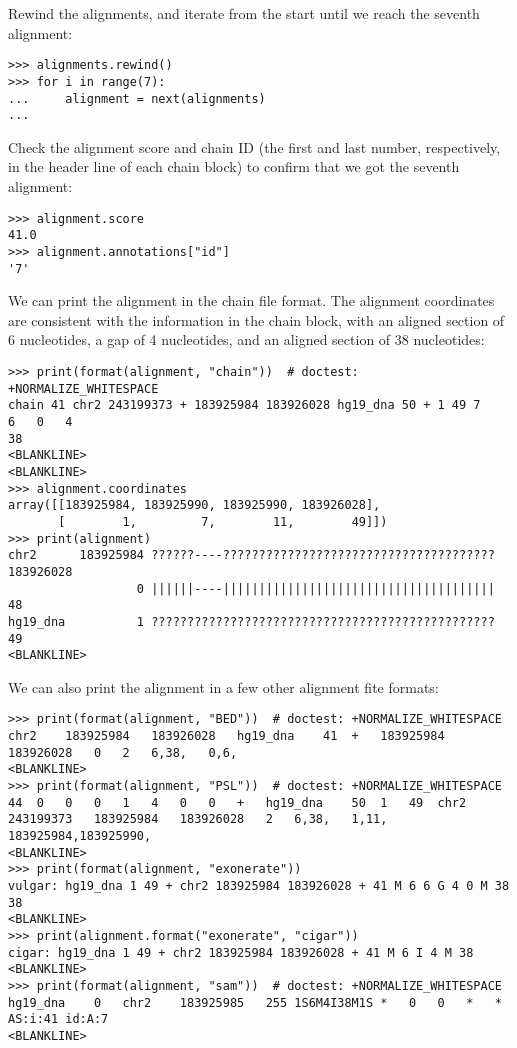 Rewind the alignments, and iterate from the start until we reach the seventh alignment:
\begin{verbatim}
>>> alignments.rewind()
>>> for i in range(7):
...     alignment = next(alignments)
...
\end{verbatim}
Check the alignment score and chain ID (the first and last number, respectively, in the header line of each chain block) to confirm that we got the seventh alignment:
\begin{verbatim}
>>> alignment.score
41.0
>>> alignment.annotations["id"]
'7'
\end{verbatim}
We can print the alignment in the chain file format. The alignment coordinates are consistent with the information in the chain block, with an aligned section of 6 nucleotides, a gap of 4 nucleotides, and an aligned section of 38 nucleotides:
\begin{verbatim}
>>> print(format(alignment, "chain"))  # doctest: +NORMALIZE_WHITESPACE
chain 41 chr2 243199373 + 183925984 183926028 hg19_dna 50 + 1 49 7
6	0	4
38
<BLANKLINE>
<BLANKLINE>
>>> alignment.coordinates
array([[183925984, 183925990, 183925990, 183926028],
       [        1,         7,        11,        49]])
>>> print(alignment)
chr2      183925984 ??????----?????????????????????????????????????? 183926028
                  0 ||||||----||||||||||||||||||||||||||||||||||||||        48
hg19_dna          1 ????????????????????????????????????????????????        49
<BLANKLINE>
\end{verbatim}
We can also print the alignment in a few other alignment fite formats:
\begin{verbatim}
>>> print(format(alignment, "BED"))  # doctest: +NORMALIZE_WHITESPACE
chr2	183925984	183926028	hg19_dna	41	+	183925984	183926028	0	2	6,38,	0,6,
<BLANKLINE>
>>> print(format(alignment, "PSL"))  # doctest: +NORMALIZE_WHITESPACE
44	0	0	0	1	4	0	0	+	hg19_dna	50	1	49	chr2	243199373	183925984	183926028	2	6,38,	1,11,	183925984,183925990,
<BLANKLINE>
>>> print(format(alignment, "exonerate"))
vulgar: hg19_dna 1 49 + chr2 183925984 183926028 + 41 M 6 6 G 4 0 M 38 38
<BLANKLINE>
>>> print(alignment.format("exonerate", "cigar"))
cigar: hg19_dna 1 49 + chr2 183925984 183926028 + 41 M 6 I 4 M 38
<BLANKLINE>
>>> print(format(alignment, "sam"))  # doctest: +NORMALIZE_WHITESPACE
hg19_dna	0	chr2	183925985	255	1S6M4I38M1S	*	0	0	*	*	AS:i:41	id:A:7
<BLANKLINE>
\end{verbatim}
